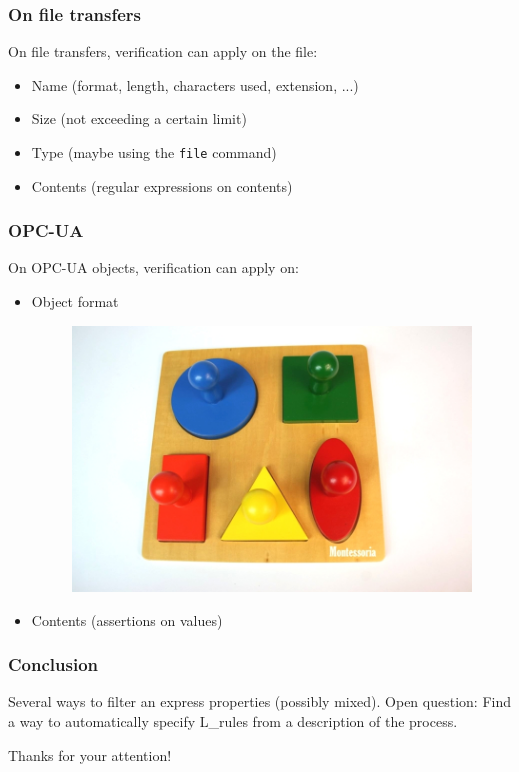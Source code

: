 \documentclass{beamer}
\begin{document}
\begin{frame}
    \frametitle{On file transfers}

    On file transfers, verification can apply on the file:
    \vfill
    \begin{itemize}
        \item Name (format, length, characters used, extension, ...)
            \vfill
        \item Size (not exceeding a certain limit)
            \vfill
        \item Type (maybe using the {\tt file} command)
            \vfill
        \item Contents (regular expressions on contents)
    \end{itemize}
\end{frame}

\begin{frame}
    \frametitle{OPC-UA}

    On OPC-UA objects, verification can apply on:
    \vfill
    \begin{itemize}
        \item Object format
              \begin{figure}[htb]
                  \centering
                  \includegraphics[scale=.15]{game}
              \end{figure}
            \vfill
        \item Contents (assertions on values)
    \end{itemize}
\end{frame}

\begin{frame}
    \frametitle{Conclusion}
    Several ways to filter an express properties (possibly mixed).
    \vfill
    Open question: Find a way to automatically specify L\_rules from a description of the process.
    \vfill
    \begin{center}
        Thanks for your attention!
    \end{center}
\end{frame}
\end{document}
